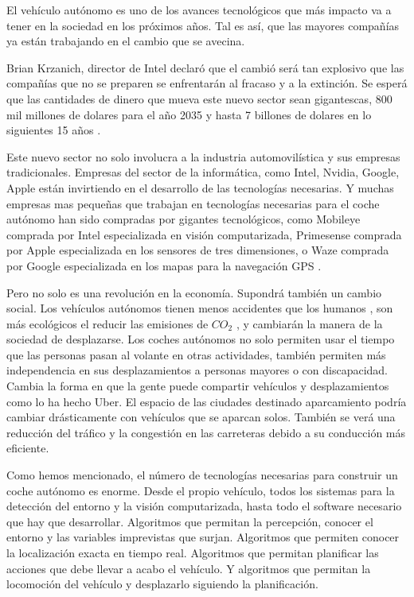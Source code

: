 
El vehículo autónomo es uno de los avances tecnológicos que más impacto va a tener en la sociedad en los próximos años. Tal es así, que las mayores compañías ya están trabajando en el cambio que se avecina.

Brian Krzanich, director de Intel declaró \cite{webtelegraphselfdrivingcars} que el cambió será tan explosivo que las compañías que no se preparen se enfrentarán al fracaso y a la extinción. Se esperá que las cantidades de dinero que mueva este nuevo sector sean gigantescas, 800 mil millones de dolares para el año 2035 y hasta 7 billones de dolares en lo siguientes 15 años \cite{webtelegraphselfdrivingcars}.

Este nuevo sector no solo involucra a la industria automovilística y sus empresas tradicionales. Empresas del sector de la informática, como Intel, Nvidia, Google, Apple están invirtiendo en el desarrollo de las tecnologías necesarias. Y muchas empresas mas pequeñas que trabajan en tecnologías necesarias para el coche autónomo han sido compradas por gigantes tecnológicos, como Mobileye comprada por Intel especializada en visión computarizada, Primesense comprada por Apple especializada en los sensores de tres dimensiones, o Waze comprada por Google especializada en los mapas para la navegación GPS \cite{webtechcrunchselfdrivingcars}.

Pero no solo es una revolución en la economía. Supondrá también un cambio social. Los vehículos autónomos tienen menos accidentes que los humanos \cite{webfastcompanyselfdrivingcars}, son más ecológicos el reducir las emisiones de $CO_2$ \cite{webbusinessinsiderdrivingcars}, y cambiarán la manera de la sociedad de desplazarse. Los coches autónomos no solo permiten usar el tiempo que las personas pasan al volante en otras actividades, también permiten más independencia en sus desplazamientos a personas mayores o con discapacidad. Cambia la forma en que la gente puede compartir vehículos y desplazamientos como lo ha hecho Uber. El espacio de las ciudades destinado aparcamiento podría cambiar drásticamente con vehículos que se aparcan solos. También se verá una reducción del tráfico y la congestión en las carreteras debido a su conducción más eficiente.

Como hemos mencionado, el número de tecnologías necesarias para construir un coche autónomo es enorme. Desde el propio vehículo, todos los sistemas para la detección del entorno y la visión computarizada, hasta todo el software necesario que hay que desarrollar. Algoritmos que permitan la percepción, conocer el entorno y las variables imprevistas que surjan. Algoritmos que permiten conocer la localización exacta en tiempo real. Algoritmos que permitan planificar las acciones que debe llevar a acabo el vehículo. Y algoritmos que permitan la locomoción del vehículo y desplazarlo siguiendo la planificación.

